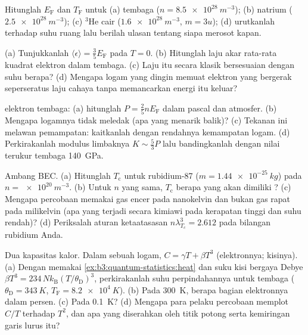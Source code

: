 \begin{exercise}[$\star$]\label{exo:b3:quantum-statistics:1}
Hitunglah $E_{\text{F}}$ dan $T_{\text{F}}$ untuk (a) tembaga
($n = \qty{8.5e28}{m^{-3}}$); (b) natrium ($\qty{2.5e28}{m^{-3}}$);
(c) $^3$He cair ($\qty{1.6e28}{m^{-3}}$, $m = 3u$); (d) urutkanlah
terhadap suhu ruang lalu berilah ulasan tentang siapa merosot kapan.
\end{exercise}

\begin{exercise}[$\star$]\label{exo:b3:quantum-statistics:2}
(a) Tunjukkanlah $\langle\epsilon\rangle = \tfrac35 E_{\text{F}}$ pada $T =
0$. (b) Hitunglah laju akar rata-rata kuadrat elektron dalam tembaga.
(c) Laju itu secara klasik bersesuaian dengan suhu berapa? (d) Mengapa
logam yang dingin memuat elektron yang bergerak seperseratus laju cahaya
tanpa memancarkan energi itu keluar?
\end{exercise}

\begin{exercise}[$\star$]\label{exo:b3:quantum-statistics:3}
 elektron tembaga: (a) hitunglah $P =
\tfrac25 nE_{\text{F}}$ dalam pascal dan atmosfer. (b) Mengapa
logamnya tidak meledak (apa yang menarik balik)? (c) Tekanan ini
melawan pemampatan: kaitkanlah dengan rendahnya kemampatan logam. (d)
Perkirakanlah modulus limbaknya $K \sim \tfrac53 P$ lalu bandingkanlah
dengan nilai terukur tembaga \qty{140}{GPa}.
\end{exercise}

\begin{exercise}[$\star$]\label{exo:b3:quantum-statistics:4}
Ambang BEC. (a) Hitunglah $T_{\text{c}}$ untuk rubidium-87 ($m =
\qty{1.44e-25}{kg}$) pada $n = \qty{e20}{m^{-3}}$. (b) Untuk $n$ yang
sama, $T_{\text{c}}$ berapa yang akan dimiliki ? (c)
Mengapa percobaan memakai gas encer pada nanokelvin dan bukan gas rapat
pada milikelvin (apa yang terjadi secara kimiawi pada kerapatan tinggi
dan suhu rendah)? (d) Periksalah aturan ketaatasasan $n\lambda_{T_c}^3
= 2.612$ pada bilangan rubidium Anda.
\end{exercise}

\begin{exercise}[$\star\star$]\label{exo:b3:quantum-statistics:5}
Dua kapasitas kalor. Dalam sebuah logam, $C = \gamma T +
\beta T^3$ (elektronnya; kisinya). (a) Dengan memakai
\cref{ex:b3:quantum-statistics:heat} dan suku kisi bergaya Debye
$\beta T^3 = 234\,Nk_{\text{B}}(T/\theta_{\text{D}})^3$,
perkirakanlah suhu perpindahannya untuk tembaga
($\theta_{\text{D}} = \qty{343}{K}$, $T_{\text{F}} =
\qty{8.2e4}{K}$). (b) Pada \qty{300}{K}, berapa bagian elektronnya dalam
persen. (c) Pada \qty{0.1}{K}? (d) Mengapa para pelaku percobaan
memplot $C/T$ terhadap $T^2$, dan apa yang diserahkan oleh titik potong
serta kemiringan garis lurus itu?
\end{exercise}

